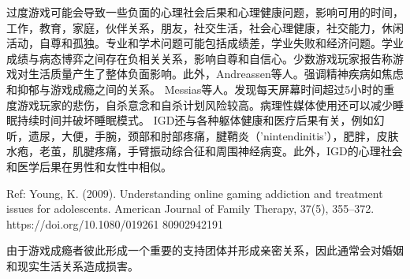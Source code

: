 过度游戏可能会导致一些负面的心理社会后果和心理健康问题，影响可用的时间，工作，教育，家庭，伙伴关系，朋友，社交生活，社会心理健康，社交能力，休闲活动，自尊和孤独。专业和学术问题可能包括成绩差，学业失败和经济问题。学业成绩与病态博弈之间存在负相关关系，影响自尊和自信心。少数游戏玩家报告称游戏对生活质量产生了整体负面影响。此外，Andreassen等人。强调精神疾病如焦虑和抑郁与游戏成瘾之间的关系。 Messias等人。发现每天屏幕时间超过5小时的重度游戏玩家的悲伤，自杀意念和自杀计划风险较高。病理性媒体使用还可以减少睡眠持续时间并破坏睡眠模式。 IGD还与各种躯体健康和医疗后果有关，例如幻听，遗尿，大便，手腕，颈部和肘部疼痛，腱鞘炎（'nintendinitis'），肥胖，皮肤水疱，老茧，肌腱疼痛，手臂振动综合征和周围神经病变。此外，IGD的心理社会和医学后果在男性和女性中相似。

Ref: Young, K. (2009). Understanding online gaming addiction and treatment issues for adolescents. American Journal of Family Therapy, 37(5), 355–372. https://doi.org/10.1080/019261
80902942191

由于游戏成瘾者彼此形成一个重要的支持团体并形成亲密关系，因此通常会对婚姻和现实生活关系造成损害。



